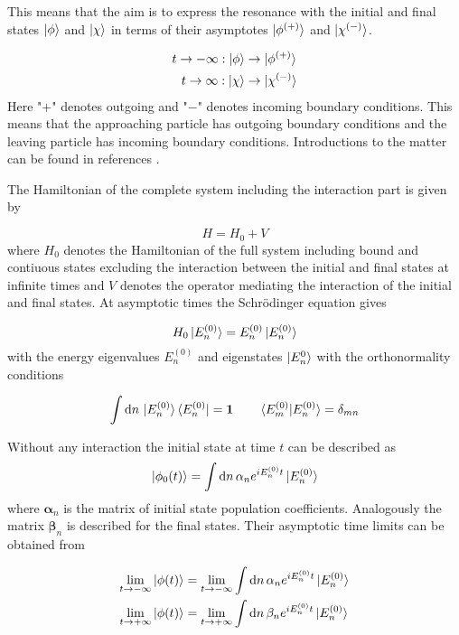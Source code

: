 This means that the aim is to express the resonance with the initial and final
states $\ket{\phi}$ and $\ket{\chi}$ in terms of their asymptotes
$\ket{\phi ^{(+)}}$ and $\ket{\chi ^{(-)}}$.

\begin{align}
  t \rightarrow -\infty:  \ket{\phi}  &\rightarrow \ket{\phi ^{(+)}}\\
  t \rightarrow \infty :  \ket{\chi}  &\rightarrow \ket{\chi ^{(-)}}
\end{align}
Here "$+$" denotes outgoing and "$-$" denotes incoming boundary conditions.
This means that the approaching particle has outgoing boundary conditions and the
leaving particle has incoming boundary conditions. Introductions to the matter
can be found in references \cite{nolting52,Gell-Mann53,Taylor87}.

The Hamiltonian of the complete system including the interaction part
is given by

\begin{equation}
  H = H_0 + V
\end{equation}
where $H_0$ denotes the Hamiltonian of the full system including
bound and contiuous states excluding the interaction
between the initial and final states at infinite times and $V$ denotes the
operator mediating the interaction of the initial and final states.
At asymptotic times the Schrödinger equation gives

\begin{equation}
 H_0 \ket{E_n^{(0)}} = E_n^{(0)} \ket{E_n^{(0)}}
\end{equation}
with the energy eigenvalues $E_n^{(0)}$ and eigenstates $\ket{E_n^{0}}$ with the
orthonormality conditions

\begin{equation}
 \int \mathrm{d}n \, \ket{E_n^{(0)}} \bra{E_n^{(0)}} = \mathbf{1} \quad\quad
 \braket{E_m^{(0)} |E_n^{(0)}} = \delta_{mn}
\end{equation}

Without any interaction the initial state at time $t$ can be described as
\begin{equation}
 \ket{\phi_0(t)} = \int \mathrm{d}n \, \mathbf{\alpha}_n e^{iE_n^{(0)}t} \ket{E_n^{(0)}}
\end{equation}
where $\mathbf{\alpha}_n$ is the matrix of initial state population coefficients.
Analogously the matrix $\mathbf{\beta}_n$ is described for the final states.
Their asymptotic time limits can be obtained from

\begin{align}
 \lim_{t \to -\infty} \ket{\phi(t)} &= \lim_{t \to -\infty}
       \int \mathrm{d}n \, \mathbf{\alpha}_n e^{iE_n^{(0)}t} \ket{E_n^{(0)}}   \\
 \lim_{t \to +\infty} \ket{\phi(t)} &= \lim_{t \to +\infty}
       \int \mathrm{d}n \, \mathbf{\beta}_n e^{iE_n^{(0)}t} \ket{E_n^{(0)}}   
\end{align}

